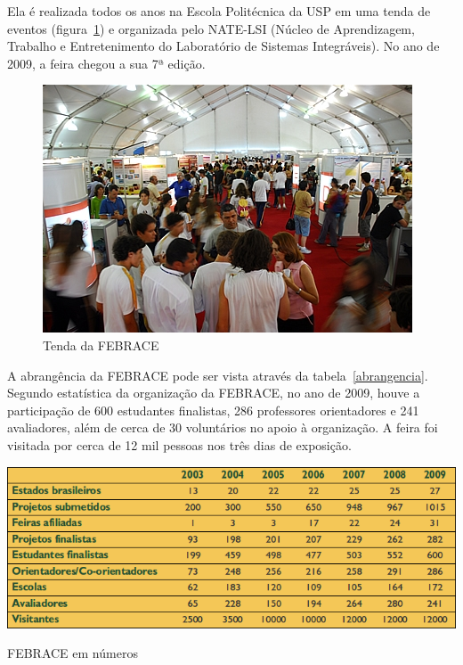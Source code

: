 Ela é realizada todos os anos na Escola Politécnica da USP em uma tenda de eventos (figura~\ref{febrace}) e organizada pelo NATE-LSI (Núcleo de Aprendizagem, Trabalho e Entretenimento do Laboratório de Sistemas Integráveis). No ano de 2009, a feira chegou a sua 7ª edição.

    \begin{figure}
        \begin{center}
    \includegraphics[width=1.0\linewidth]{arquivos/febrace.jpg}
        \end{center}
        \caption{Tenda da FEBRACE}
        \label{febrace}
    \end{figure}

A abrangência da FEBRACE pode ser vista através da tabela~\ref{abrangencia}. Segundo estatística da organização da FEBRACE, no ano de 2009, houve a participação de 600 estudantes finalistas, 286 professores orientadores e 241 avaliadores, além de cerca de 30 voluntários no apoio à organização. A feira foi visitada por cerca de 12 mil pessoas nos três dias de exposição. 

\begin{table}[h]
    \begin{center}
        \includegraphics[width=0.8\linewidth]{arquivos/abrangencia.png}
    \end{center}
    \caption{FEBRACE em números}
    \label{abrangencia}
\end{table}

